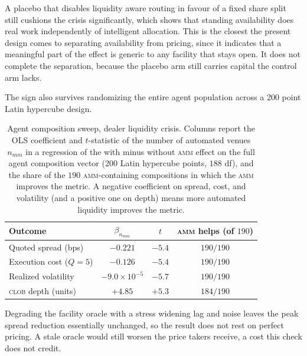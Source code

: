 \documentclass[a4paper,fleqn]{cas-sc}
\newcommand{\acro}[1]{\textsc{\MakeLowercase{#1}}\xspace}
\newcommand{\CLOB}{\acro{CLOB}}
\newcommand{\AMM}{\acro{AMM}}
\begin{document}
A placebo that disables liquidity aware routing in favour of a fixed share split still cushions the crisis significantly, which shows that standing availability does real work independently of intelligent allocation. This is the closest the present design comes to separating availability from pricing, since it indicates that a meaningful part of the effect is generic to any facility that stays open. It does not complete the separation, because the placebo arm still carries capital the control arm lacks.

The sign also survives randomizing the entire agent population across a 200 point Latin hypercube design.

\begin{table}[h]
\centering
\footnotesize
\caption{Agent composition sweep, dealer liquidity crisis. Columns report the OLS coefficient and $t$-statistic of the number of automated venues $n_{mm}$ in a regression of the with minus without \AMM{} effect on the full agent composition vector ($200$ Latin hypercube points, $188$ df), and the share of the $190$ \AMM{}-containing compositions in which the \AMM{} improves the metric. A negative coefficient on spread, cost, and volatility (and a positive one on depth) means more automated liquidity improves the metric.}
\label{tab:composition}
\begin{tabular}{lccc}
\toprule
Outcome & $\beta_{n_{mm}}$ & $t$ & \AMM{} helps (of $190$) \\
\midrule
Quoted spread (bps)      & $-0.221$              & $-5.4$ & $190/190$ \\
Execution cost ($Q{=}5$) & $-0.126$              & $-5.4$ & $190/190$ \\
Realized volatility      & $-9.0\times10^{-5}$   & $-5.7$ & $190/190$ \\
\CLOB{} depth (units)    & $+4.85$               & $+5.3$ & $184/190$ \\
\bottomrule
\end{tabular}
\end{table}

Degrading the facility oracle with a stress widening lag and noise leaves the peak spread reduction essentially unchanged, so the result does not rest on perfect pricing. A stale oracle would still worsen the price takers receive, a cost this check does not credit.
\end{document}
